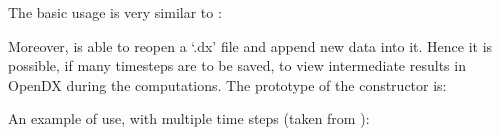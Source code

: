 \documentclass[a4paper,11pt,english]{sphinxmanual}
\begin{document}
The basic usage is very similar to :

\begin{sphinxVerbatim}[commandchars=\\\{\}]
 
  
\end{sphinxVerbatim}

Moreover,  is able to reopen a ‘.dx’ file and append new data into
it. Hence it is possible, if many time\sphinxhyphen{}steps are to be saved, to view intermediate
results in OpenDX during the computations. The prototype of the constructor is:

\begin{sphinxVerbatim}[commandchars=\\\{\}]
          
     
\end{sphinxVerbatim}

An example of use, with multiple time steps (taken from
):
\end{document}
